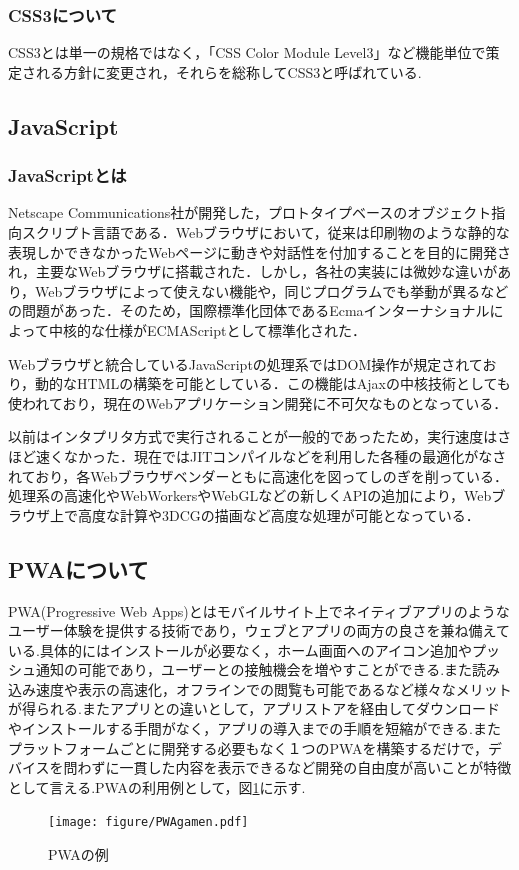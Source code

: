\documentclass[a4j,12pt]{jarticle}
\begin{document}
\subsubsection{CSS3について}
CSS3とは単一の規格ではなく，「CSS Color Module Level3」など機能単位で策定される方針に変更され，それらを総称してCSS3と呼ばれている.
\subsection{JavaScript}
\subsubsection{JavaScriptとは}
Netscape Communications社が開発した，プロトタイプベースのオブジェクト指向スクリプト言語である．Webブラウザにおいて，従来は印刷物のような静的な表現しかできなかったWebページに動きや対話性を付加することを目的に開発され，主要なWebブラウザに搭載された．しかし，各社の実装には微妙な違いがあり，Webブラウザによって使えない機能や，同じプログラムでも挙動が異るなどの問題があった．そのため，国際標準化団体であるEcmaインターナショナルによって中核的な仕様がECMAScriptとして標準化された．

Webブラウザと統合しているJavaScriptの処理系ではDOM操作が規定されており，動的なHTMLの構築を可能としている．この機能はAjaxの中核技術としても使われており，現在のWebアプリケーション開発に不可欠なものとなっている．

以前はインタプリタ方式で実行されることが一般的であったため，実行速度はさほど速くなかった．現在ではJITコンパイルなどを利用した各種の最適化がなされており，各Webブラウザベンダーともに高速化を図ってしのぎを削っている．
処理系の高速化やWebWorkersやWebGLなどの新しくAPIの追加により，Webブラウザ上で高度な計算や3DCGの描画など高度な処理が可能となっている\cite{ren9}．

\subsection{PWAについて}
PWA(Progressive Web Apps)とはモバイルサイト上でネイティブアプリのようなユーザー体験を提供する技術であり，ウェブとアプリの両方の良さを兼ね備えている.具体的にはインストールが必要なく，ホーム画面へのアイコン追加やプッシュ通知の可能であり，ユーザーとの接触機会を増やすことができる.また読み込み速度や表示の高速化，オフラインでの閲覧も可能であるなど様々なメリットが得られる.またアプリとの違いとして，アプリストアを経由してダウンロードやインストールする手間がなく，アプリの導入までの手順を短縮ができる.またプラットフォームごとに開発する必要もなく１つのPWAを構築するだけで，デバイスを問わずに一貫した内容を表示できるなど開発の自由度が高いことが特徴として言える\cite{ren6}.PWAの利用例として，図\ref{fig:f}に示す.
\begin{figure}[h]
\begin{center}
 \texttt{[image: figure/PWAgamen.pdf]}
\end{center}
 \caption{PWAの例}
 \label{fig:f}
\end{figure}
\newpage
\end{document}
